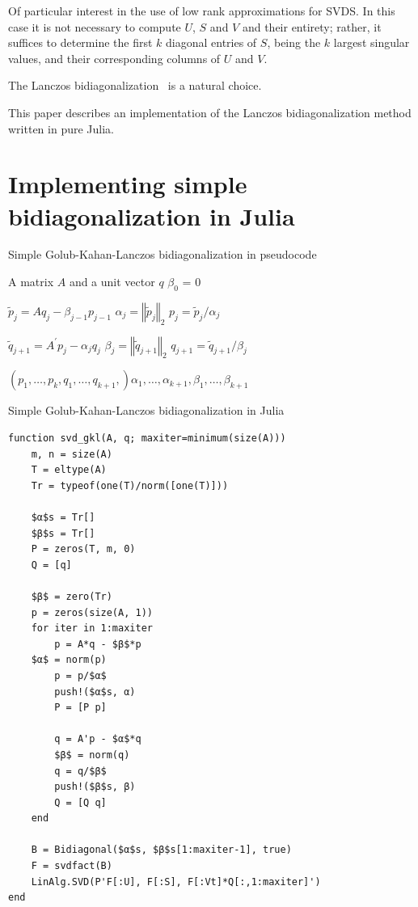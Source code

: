 \documentclass[final,leqno]{siamltex1213}
\begin{document}
Of particular interest in the use of low rank approximations for SVDS.
In this case it is not necessary to compute $U$, $S$ and $V$ and
their entirety; rather, it suffices to determine the first $k$ diagonal
entries of $S$, being the $k$ largest singular values, and their
corresponding columns of $U$ and $V$.

The Lanczos bidiagonalization~\cite{Golub1965} is a natural choice.

This paper describes an implementation of the Lanczos bidiagonalization
method written in pure Julia.

\section{Implementing simple bidiagonalization in Julia}

\begin{algorithm}
\caption{Simple Golub-Kahan-Lanczos bidiagonalization in pseudocode}

\begin{algorithmic}
\REQUIRE A matrix $A$ and a unit vector $q$
\STATE $\beta_0$ = 0

\STATE $\tilde{p}_j = A q_j - \beta_{j-1} p_{j-1}$
\STATE $\alpha_j = \left\Vert \tilde{p}_j \right\Vert_2$
\STATE $p_j = \tilde{p}_j / \alpha_j$

\STATE $\tilde{q}_{j+1} = A^\prime p_j - \alpha_j q_j$
\STATE $\beta_j = \left\Vert \tilde{q}_{j+1} \right\Vert_2$
\STATE $q_{j+1} = \tilde{q}_{j+1} / \beta_j$

\ENDFOR
\RETURN $\left(p_1, \dots, p_k, q_1, \dots, q_{k+1},\right) \alpha_1, \dots, \alpha_{k+1}, \beta_1, \dots, \beta_{k+1}$
\end{algorithmic}
\end{algorithm}



\begin{algorithm}
\caption{Simple Golub-Kahan-Lanczos bidiagonalization in Julia}

\begin{lstlisting}
function svd_gkl(A, q; maxiter=minimum(size(A)))
    m, n = size(A)
    T = eltype(A)
    Tr = typeof(one(T)/norm([one(T)]))

    $α$s = Tr[]
    $β$s = Tr[]
    P = zeros(T, m, 0)
    Q = [q]

    $β$ = zero(Tr)
    p = zeros(size(A, 1))
    for iter in 1:maxiter
        p = A*q - $β$*p
	$α$ = norm(p)
        p = p/$α$
        push!($α$s, α)
        P = [P p]

        q = A'p - $α$*q
        $β$ = norm(q)
        q = q/$β$
        push!($β$s, β)
        Q = [Q q]
    end

    B = Bidiagonal($α$s, $β$s[1:maxiter-1], true)
    F = svdfact(B)
    LinAlg.SVD(P'F[:U], F[:S], F[:Vt]*Q[:,1:maxiter]')
end
\end{lstlisting}
\end{algorithm}
\end{document}
